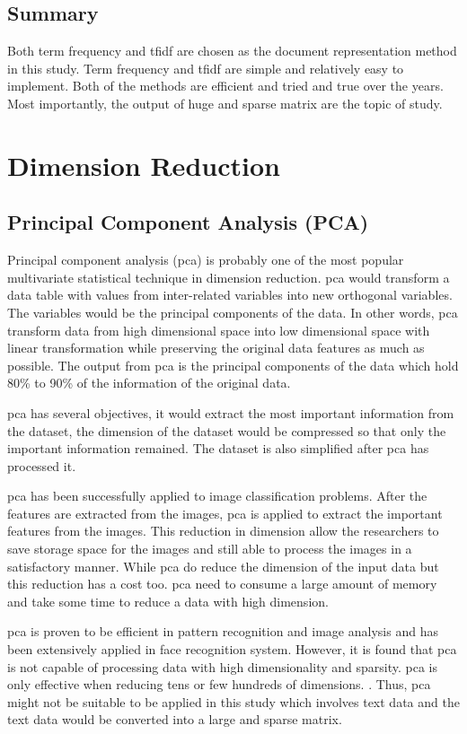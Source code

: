 \subsection{Summary}
Both term frequency and \ac{tfidf} are chosen as the document representation method in this study. Term frequency and \ac{tfidf} are simple and relatively easy to implement. Both of the methods are efficient and tried and true over the years. Most importantly, the output of huge and sparse matrix are the topic of study.\\

\clearpage
\section{Dimension Reduction}
\subsection{Principal Component Analysis (PCA)}
Principal component analysis (\ac{pca}) is probably one of the most popular multivariate statistical technique in dimension reduction. \Ac{pca} would transform a data table with values from inter-related variables into new orthogonal variables. The variables would be the principal components of the data. In other words, \ac{pca} transform data from high dimensional space into low dimensional space with linear transformation while preserving the original data features as much as possible. \cite{pcaImage} The output from \ac{pca} is the principal components of the data which hold 80\% to 90\% of the information of the original data.

\Ac{pca} has several objectives, it would extract the most important information from the dataset, the dimension of the dataset would be compressed so that only the important information remained. The dataset is also simplified after \ac{pca} has processed it. \cite{pcaObj}

\Ac{pca} has been successfully applied to image classification problems. After the features are extracted from the images, \ac{pca} is applied to extract the important features from the images. This reduction in dimension allow the researchers to save storage space for the images and still able to process the images in a satisfactory manner. While \ac{pca} do reduce the dimension of the input data but this reduction has a cost too. \Ac{pca} need to consume a large amount of memory and take some time to reduce a data with high dimension. \cite{pcaImage}

\Ac{pca} is proven to be efficient in pattern recognition and image analysis and has been extensively applied in face recognition system. However, it is found that \ac{pca} is not capable of processing data with high dimensionality and sparsity. \ac{pca} is only effective when reducing tens or few hundreds of dimensions. \cite{dimRedCat}. Thus, \ac{pca} might not be suitable to be applied in this study which involves text data and the text data would be converted into a large and sparse matrix.\\

